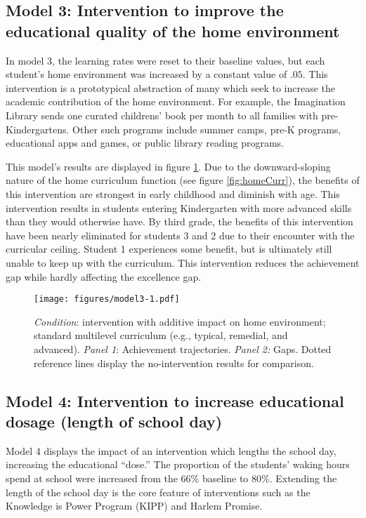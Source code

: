 \documentclass[english,floatsintext,jou]{apa6}
\theoremstyle{definition}
\theoremstyle{definition}
\theoremstyle{definition}
\theoremstyle{remark}
\begin{document}
\subsection{Model 3: Intervention to improve the educational quality of
the home
environment}\label{model-3-intervention-to-improve-the-educational-quality-of-the-home-environment}

In model 3, the learning rates were reset to their baseline values, but
each student's home environment was increased by a constant value of
\(.05\). This intervention is a prototypical abstraction of many which
seek to increase the academic contribution of the home environment. For
example, the Imagination Library sends one curated childrens' book per
month to all families with pre-Kindergartens. Other such programs
include summer camps, pre-K programs, educational apps and games, or
public library reading programs.

This model's results are displayed in figure \ref{fig:model3}. Due to
the downward-sloping nature of the home curriculum function (see figure
\ref{fig:homeCurr}), the benefits of this intervention are strongest in
early childhood and diminish with age. This intervention results in
students entering Kindergarten with more advanced skills than they would
otherwise have. By third grade, the benefits of this intervention have
been nearly eliminated for students 3 and 2 due to their encounter with
the curricular ceiling. Student 1 experiences some benefit, but is
ultimately still unable to keep up with the curriculum. This
intervention reduces the achievement gap while hardly affecting the
excellence gap.

\begin{figure}[htbp]
\centering
\texttt{[image: figures/model3-1.pdf]}
\caption{\label{fig:model3}\emph{Condition}: intervention with additive
impact on home environment; standard multilevel curriculum (e.g.,
typical, remedial, and advanced). \emph{Panel 1}: Achievement
trajectories. \emph{Panel 2:} Gaps. Dotted reference lines display the
no-intervention results for comparison.}
\end{figure}

\subsection{Model 4: Intervention to increase educational dosage (length
of school
day)}\label{model-4-intervention-to-increase-educational-dosage-length-of-school-day}

Model 4 displays the impact of an intervention which lengths the school
day, increasing the educational \enquote{dose.} The proportion of the
students' waking hours spend at school were increased from the 66\%
baseline to 80\%. Extending the length of the school day is the core
feature of interventions such as the Knowledge is Power Program (KIPP)
and Harlem Promise.
\end{document}
